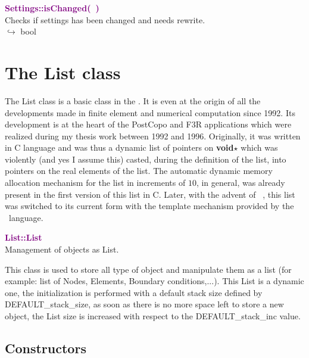 
\textcolor{purple}{\textbf{Settings::isChanged(~)}}\label{Settings::isChanged()}\\
Checks if settings has been changed and needs rewrite.\\ \hspace*{10mm}$\hookrightarrow$ bool


\section{The List class}

The List class is a basic class in the \DynELA. It is even at the origin of all the developments made in finite element and numerical computation since 1992. Its development is at the heart of the PostCopo and F3R applications which were realized during my thesis work between 1992 and 1996. Originally, it was written in C language and was thus a dynamic list of pointers on \textbf{void$\star$} which was violently (and yes I assume this) casted, during the definition of the list, into pointers on the real elements of the list. The automatic dynamic memory allocation mechanism for the list in increments of $10$, in general, was already present in the first version of this list in C. Later, with the advent of \Cpp~, this list was switched to its current form with the template mechanism provided by the \Cpp~language.

\textcolor{purple}{\textbf{List::List}}\label{List::List}\\
Management of objects as List.

This class is used to store all type of object and manipulate them as a list (for example: list of Nodes, Elements, Boundary conditions,...).
This List is a dynamic one, the initialization is performed with a default stack size defined by DEFAULT\_stack\_size, as soon as there is no more space left to store a new object,
the List size is increased with respect to the DEFAULT\_stack\_inc value.

\subsection{Constructors}

